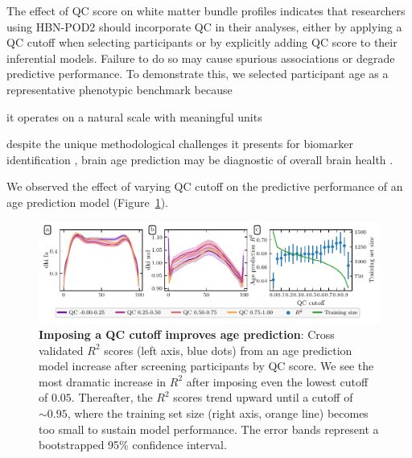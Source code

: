 \documentclass[fleqn,10pt,inline]{wlscirep}
\begin{document}
The effect of QC score on white matter bundle profiles indicates that researchers
using HBN-POD2 should incorporate QC in their analyses, either by applying a QC cutoff
when selecting participants or by explicitly adding QC score to their inferential
models. Failure to do so may cause spurious associations or degrade predictive
performance. To demonstrate this, we selected participant age as a representative phenotypic benchmark because
\begin{enumerate*}[%
    label=(\roman*),%
    before=\unskip{ },%
    itemjoin={{, }},%
    itemjoin*={{ and }}]
    \item it operates on a natural scale with meaningful units
    \item despite the unique methodological challenges it presents for biomarker identification \cite{nelson2020biomarkers}, brain age prediction may be diagnostic of overall brain health \cite{franke2010estimating, cole2019brain, richie-halford2021multidimensional}.
\end{enumerate*}
We observed the effect of varying QC cutoff on the predictive performance of an age
prediction model (Figure~\ref{fig:age-prediction}).

\begin{figure}[tbp]
    \centering
    \includegraphics[width=\linewidth]{qc_sweep.pdf}
    \caption{%
        {\bf Imposing a QC cutoff improves age prediction}:
        Cross validated $R^2$ scores (left axis, blue dots) from an age
        prediction model increase after screening participants by QC score. We see
        the most dramatic increase in $R^2$ after imposing even the lowest
        cutoff of $0.05$. Thereafter, the $R^2$ scores trend upward until a
        cutoff of $\sim 0.95$, where the training set size (right axis, orange
        line) becomes too small to sustain model performance. The error bands
        represent a bootstrapped 95\% confidence interval.
    }
    \label{fig:age-prediction}
\end{figure}
\end{document}
